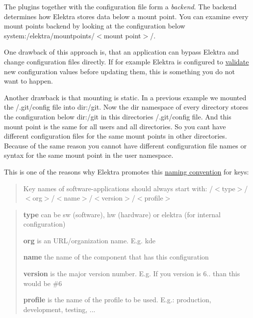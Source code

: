 The plugins together with the configuration file form a {\itshape backend}. The backend determines how Elektra stores data below a mount point. You can examine every mount points backend by looking at the configuration below {\ttfamily system\+:/elektra/mountpoints/$<$mount point$>$/}.

One drawback of this approach is, that an application can bypass Elektra and change configuration files directly. If for example Elektra is configured to \hyperlink{doc_tutorials_validation_md}{validate} new configuration values before updating them, this is something you do not want to happen.

Another drawback is that mounting is static. In a previous example we mounted the {\ttfamily /.git/config} file into {\ttfamily dir\+:/git}. Now the {\ttfamily dir} namespace of every directory stores the configuration below {\ttfamily dir\+:/git} in this directories {\ttfamily /.git/config} file. And this mount point is the same for all users and all directories. So you can\textquotesingle{}t have different configuration files for the same mount points in other directories. Because of the same reason you cannot have different configuration file names or syntax for the same mount point in the {\ttfamily user} namespace.

This is one of the reasons why Elektra promotes this \hyperlink{doc_help_elektra-key-names_md}{naming convention} for keys\+:

\begin{quote}
Key names of software-\/applications should always start with\+: {\ttfamily /$<$type$>$/$<$org$>$/$<$name$>$/$<$version$>$/$<$profile$>$} \end{quote}


\begin{quote}

\begin{DoxyItemize}
\item {\bfseries type} can be {\ttfamily sw} (software), {\ttfamily hw} (hardware) or {\ttfamily elektra} (for internal configuration)
\item {\bfseries org} is an U\+R\+L/organization name. E.\+g. {\ttfamily kde}
\item {\bfseries name} the name of the component that has this configuration
\item {\bfseries version} is the major version number. E.\+g. If you version is 6.. than this would be {\ttfamily \#6}
\item {\bfseries profile} is the name of the profile to be used. E.\+g.\+: {\ttfamily production}, {\ttfamily development}, {\ttfamily testing}, ... 
\end{DoxyItemize}\end{quote}


